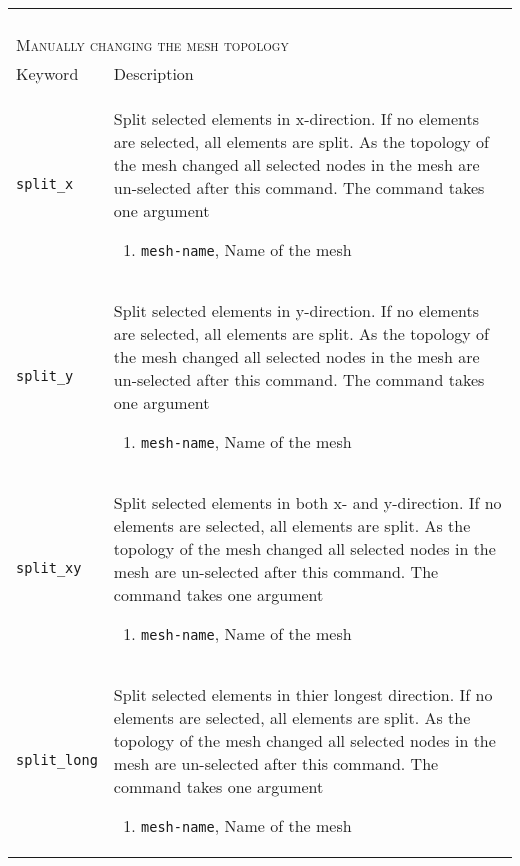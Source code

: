 \documentclass[noshowpacs,preprintnumbers,amsmath,amssymb, letter]{revtex4}
\begin{document}
\begin{longtable}{p{}p{}}
\begin{enumerate}
\end{enumerate}\\
\multicolumn{2}{l}{\textsc{Manually changing the mesh topology}} \\*
\hline
Keyword & Description \\
\texttt{split\_x}	& Split selected elements in x-direction. If no elements are selected, all elements are split. As the topology of the mesh changed all selected nodes in the mesh are un-selected after this command. The command takes one argument 
\begin{enumerate}
\item \texttt{mesh-name}, Name of the mesh
\end{enumerate}\\
\texttt{split\_y}	& Split selected elements in y-direction. If no elements are selected, all elements are split. As the topology of the mesh changed all selected nodes in the mesh are un-selected after this command. The command takes one argument 
\begin{enumerate}
\item \texttt{mesh-name}, Name of the mesh
\end{enumerate}\\
\texttt{split\_xy}	& Split selected elements in both x- and y-direction. If no elements are selected, all elements are split. As the topology of the mesh changed all selected nodes in the mesh are un-selected after this command. The command takes one argument 
\begin{enumerate}
\item \texttt{mesh-name}, Name of the mesh
\end{enumerate}\\
\texttt{split\_long}	& Split selected elements in thier longest direction. If no elements are selected, all elements are split. As the topology of the mesh changed all selected nodes in the mesh are un-selected after this command. The command takes one argument 
\begin{enumerate}
\item \texttt{mesh-name}, Name of the mesh
\end{enumerate}\\

\end{longtable}
\end{document}
